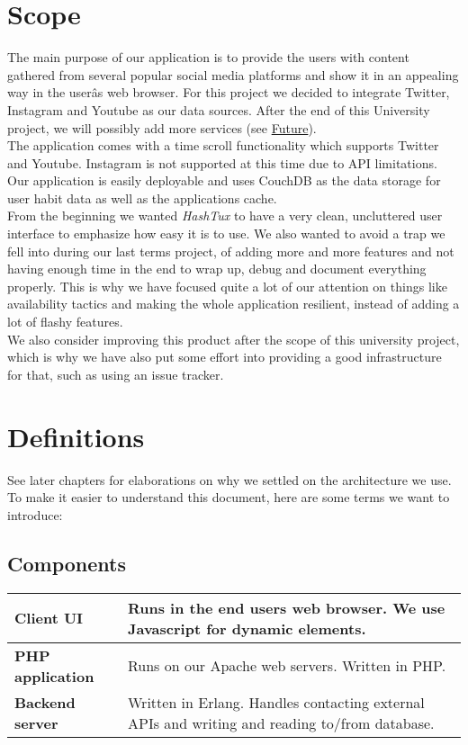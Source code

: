 \section{Scope}
The main purpose of our application is to provide the users with content
gathered from several popular social media platforms and show it in an appealing
way in the userâs web browser. \newline
For this project we decided to integrate Twitter, Instagram and Youtube as our
data sources. After the end of this University project, we will possibly add
more services (see \hyperlink{future}{Future}). \\

The application comes with a time scroll functionality which supports Twitter
and Youtube. Instagram is not supported at this time due to API limitations.
\newline
Our application is easily deployable and uses CouchDB as the data storage for
user habit data as well as the applications cache. \\

From the beginning we wanted \textit{HashTux} to have a very clean, uncluttered
user interface to emphasize how easy it is to use. We also wanted to avoid a
trap we fell into during our last terms project, of adding more and more
features and not having enough time in the end to wrap up, debug and document
everything properly. This is why we have focused quite a lot of our attention on
things like availability tactics and making the whole application resilient,
instead of adding a lot of flashy features. \\

We also consider improving this product after the scope of this university
project, which is why we have also put some effort into providing a good
infrastructure for that, such as using an issue tracker.

\section{Definitions}
See later chapters for elaborations on why we settled on the architecture we
use. To make it easier to understand this document, here are some terms we want
to introduce:

\subsection{Components}
{\tabulinesep=1.4mm
\begin{tabu}{l l}
  \textbf{Client UI}
     & \parbox[t]{8cm}{Runs in the end users web browser. We use Javascript for
     dynamic elements.} \\
  \hline
  \textbf{PHP application}
      & Runs on our Apache web servers. Written in PHP. \\
  \hline
  \textbf{Backend server} & \parbox[t]{8cm}{
     Written in Erlang. Handles contacting external APIs and writing and
     reading to/from database.}
\end{tabu}}

